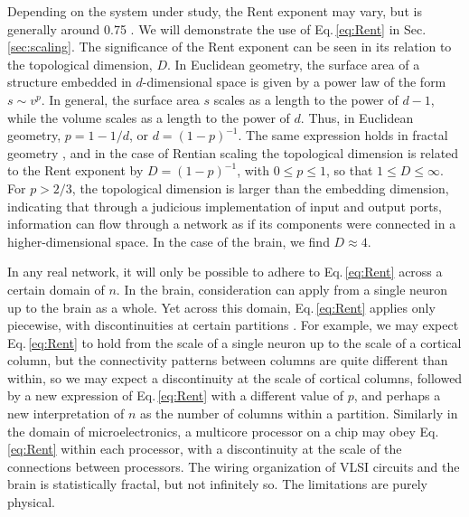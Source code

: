 \documentclass[twocolumn]{article}
\begin{document}
Depending on the system under study, the Rent exponent may vary, but is generally around 0.75 \cite{bagr2010}. We will demonstrate the use of Eq.\,\ref{eq:Rent} in Sec.\,\ref{sec:scaling}. The significance of the Rent exponent can be seen in its relation to the topological dimension, $D$. In Euclidean geometry, the surface area of a structure embedded in $d$-dimensional space is given by a power law of the form $s\sim v^p$. In general, the surface area $s$ scales as a length to the power of $d-1$, while the volume scales as a length to the power of $d$. Thus, in Euclidean geometry, $p = 1-1/d$, or $d = (1-p)^{-1}$. The same expression holds in fractal geometry \cite{ma1983,sc1991}, and in the case of Rentian scaling the topological dimension is related to the Rent exponent by $D = (1-p)^{-1}$, with $0 \le p \le 1$, so that $1 \le D \le \infty$. For $p > 2/3$, the topological dimension is larger than the embedding dimension, indicating that through a judicious implementation of input and output ports, information can flow through a network as if its components were connected in a higher-dimensional space. In the case of the brain, we find $D \approx 4$.

In any real network, it will only be possible to adhere to Eq.\,\ref{eq:Rent} across a certain domain of $n$. In the brain, consideration can apply from a single neuron up to the brain as a whole. Yet across this domain, Eq.\,\ref{eq:Rent} applies only piecewise, with discontinuities at certain partitions \cite{oz2004}. For example, we may expect Eq.\,\ref{eq:Rent} to hold from the scale of a single neuron up to the scale of a cortical column, but the connectivity patterns between columns are quite different than within, so we may expect a discontinuity at the scale of cortical columns, followed by a new expression of Eq.\,\ref{eq:Rent} with a different value of $p$, and perhaps a new interpretation of $n$ as the number of columns within a partition. Similarly in the domain of microelectronics, a multicore processor on a chip may obey Eq.\,\ref{eq:Rent} within each processor, with a discontinuity at the scale of the connections between processors. The wiring organization of VLSI circuits and the brain is statistically fractal, but not infinitely so. The limitations are purely physical.  
\end{document}
